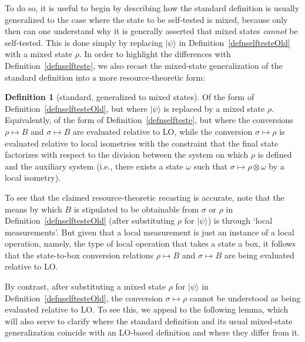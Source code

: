 \documentclass[12pt]{article}
\theoremstyle{plain}
\theoremstyle{definition}
\newtheorem{defn}{Definition}
\begin{document}
To do so, it is useful to begin by describing how the standard definition is usually generalized to the case where the state to be self-tested is mixed, because only then can one understand why it is generally asserted that mixed states {\em cannot} be self-tested.
 This is done simply by replacing $|\psi\rangle$ in Definition~\ref{defnselftesteOld}  with a mixed state $\rho$.  In order to highlight the differences with 
 Definition~\ref{defnselfteste}, we also recast the mixed-state generalization of the standard definition into a more resource-theoretic form: 
\begin{defn}[standard, generalized to mixed states]
\label{defnselftesteMixed}
Of the form of Definition~\ref{defnselftesteOld}, but where $|\psi\rangle$ is replaced by a mixed state $\rho$.
Equivalently, of the form of Definition~\ref{defnselfteste}, but where the conversions $\rho \mapsto B$ and $\sigma \mapsto B$ are evaluated relative to LO, while the conversion $\sigma \mapsto \rho$ is evaluated relative to local isometries with the constraint that the final state factorizes with respect to the division between the system on which $\rho$ is defined and the auxiliary system (i.e., there exists a state $\omega$ 
 such that $\sigma \mapsto \rho \otimes \omega$ by a local isometry).
\end{defn}

To see that the claimed resource-theoretic recasting is accurate, note that the means by which $B$ is stipulated to be obtainable from $\sigma$ or $\rho$ in Definition~\ref{defnselftesteOld} (after substituting $\rho$ for $|\psi\rangle$)
  is through `local measurements'.
  But given that a local measurement is just  an instance of a local operation, namely, the type of local operation that takes a state a box, it follows that the state-to-box conversion relations $\rho \mapsto B$ and $\sigma \mapsto B$ 
are being evaluated relative to LO.

By contrast, after substituting a mixed state $\rho$ for $|\psi\rangle$ in Definition~\ref{defnselftesteOld},  the conversion $\sigma \mapsto \rho$  cannot be understood as being evaluated relative to LO. 
To see this, we appeal to the following lemma, which will also serve to clarify where the standard definition and its usual mixed-state generalization  coincide with an LO-based definition and where they  differ from it. 
\end{document}
